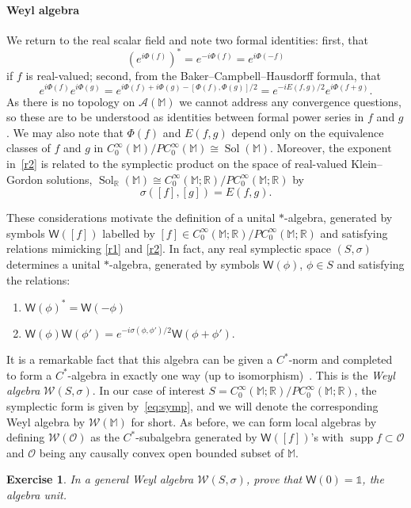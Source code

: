 \documentclass[12pt,a4paper]{article}
\newcommand{\1}{\mathds{1}}                         %
\newcommand{\RR}{\mathbb{R}}           %
\newcommand{\Ocal}{\mathcal{O}}
\newcommand{\MM}{\mathbb{M}}
\newcommand{\II}{{\mathbb{1}}}
\newcommand{\Ac}{{\mathcal{A}}}
\newcommand{\Wc}{{\mathcal{W}}}
\newcommand{\Ws}{{\mathsf{W}}}
\newcommand{\CoinX}[1]{C_0^\infty(#1)}
\newtheorem{exercise}[theorem]{Exercise}
\DeclareMathOperator{\supp}{supp}
\DeclareMathOperator{\Sol}{Sol}
\begin{document}
	
	\paragraph{Weyl algebra} We return to the real scalar field and note two formal identities: first, that
	\begin{equation}\label{r1}
	(e^{i\Phi(f)})^* = e^{-i\Phi(f)} = e^{i\Phi(-f)}
	\end{equation}
	if $f$ is real-valued; second, from the 
	Baker--Campbell--Hausdorff formula, that
	\begin{equation}\label{r2}
	e^{i\Phi(f)}e^{i\Phi(g)} = e^{i\Phi(f)+i\Phi(g) - [\Phi(f),\Phi(g)]/2} = 
	e^{-iE(f,g)/2}e^{i\Phi(f+g)}.
	\end{equation} 
 As there is no topology on $\Ac(\MM)$ we cannot address any convergence questions, so these are to be understood as identities between formal power series in $f$ and $g$.
	We may also note that $\Phi(f)$ and $E(f,g)$ depend only on the equivalence classes of $f$ and $g$ in $\CoinX{\MM}/P\CoinX{\MM}\cong\Sol(\MM)$. Moreover, the exponent in~\eqref{r2} is related to the symplectic product on the space of real-valued Klein--Gordon solutions, $\Sol_\RR(\MM)\cong\CoinX{\MM;\RR}/P\CoinX{\MM;\RR}$ by
	\begin{equation}\label{eq:symp}
	\sigma([f],[g])= E(f,g).
	\end{equation}
	
	These considerations motivate the definition of a unital $*$-algebra, generated by symbols $\Ws([f])$ labelled by $[f]\in \CoinX{\MM;\RR}/P\CoinX{\MM;\RR}$ and satisfying relations mimicking \eqref{r1} and \eqref{r2}. In fact, any real symplectic space $(S,\sigma)$ determines a unital $*$-algebra, generated by symbols $\Ws(\phi)$, $\phi\in S$ and satisfying the relations:		
	\begin{enumerate}[label=\bf W\arabic{enumi},leftmargin=*,widest=2] 
		\item $\Ws(\phi)^*=\Ws(-\phi)$
		\item $\Ws(\phi)\Ws(\phi') = e^{-i\sigma(\phi,\phi')/2}\Ws(\phi+\phi')$.
	\end{enumerate}
It is a remarkable fact that this algebra can be given a $C^*$-norm and completed
to form a $C^*$-algebra in exactly one way (up to isomorphism)~\cite{BratRob:vol2}. This is the \emph{Weyl algebra} $\Wc(S,\sigma)$. In our case of interest $S=\CoinX{\MM;\RR}/P\CoinX{\MM;\RR}$, the symplectic form is given by~\eqref{eq:symp}, and we will denote the corresponding Weyl algebra by $\Wc(\MM)$ for short. As before, we can form local algebras by defining $\Wc(\Ocal)$ as the $C^*$-subalgebra generated by $\Ws([f])$'s with $\supp f\subset \Ocal$ and $\Ocal$ being any causally convex open bounded subset of $\MM$. 
\begin{exercise} 
		In a general Weyl algebra $\Wc(S,\sigma)$, prove that $\Ws(0)=\II$, the algebra unit.
\end{exercise}  
	
\end{document}
